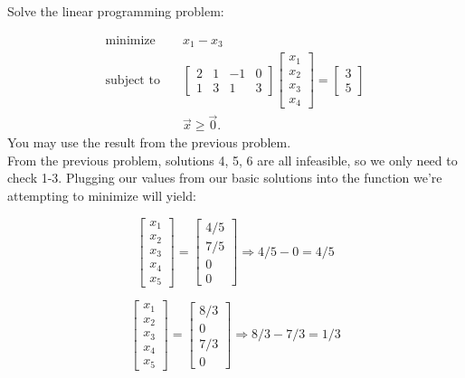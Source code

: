 \documentclass[12pt]{extarticle}
\theoremstyle{definition}
\begin{document}
\begin{problem} Solve the linear programming problem:

	\begin{align*}
	\text{minimize } \quad &x_1-x_3\\
	\text{subject to} \quad & \begin{bmatrix}
	2&1&-1&0\\1&3&1&3
	\end{bmatrix}\begin{bmatrix}
	x_1\\x_2\\x_3\\x_4
	\end{bmatrix}=\begin{bmatrix}
	3\\5
	\end{bmatrix}\\
	& \vec{x}\geq \vec{0}.
	\end{align*}
	You may use the result from the previous problem.\\

	From the previous problem, solutions 4, 5, 6 are all infeasible, so we only need to check 1-3. Plugging our values from our basic solutions into the function we're attempting to minimize will yield:

	$$\begin{bmatrix} x_1\\x_2\\x_3\\x_4\\x_5 \end{bmatrix} = \begin{bmatrix} 4/5\\7/5\\0\\0\end{bmatrix} \Longrightarrow
		4/5 - 0 = 4/5$$

	$$\begin{bmatrix} x_1\\x_2\\x_3\\x_4\\x_5 \end{bmatrix} = \begin{bmatrix} 8/3\\0\\7/3\\0\end{bmatrix} \Longrightarrow
		8/3 - 7/3 = 1/3$$


\end{problem}
\end{document}
